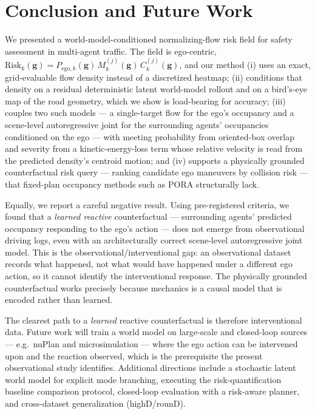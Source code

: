 \documentclass[journal]{IEEEtran}
\begin{document}
\section{Conclusion and Future Work}\label{section:conclusion_future_work}
We presented a world-model-conditioned normalizing-flow risk field for safety assessment in multi-agent traffic. The field is ego-centric, $\mathrm{Risk}_{k}(\mathbf{g})=P_{\mathrm{ego},k}(\mathbf{g})\,M^{(j)}_{k}(\mathbf{g})\,C^{(j)}_{k}(\mathbf{g})$, and our method (i) uses an exact, grid-evaluable flow density instead of a discretized heatmap; (ii) conditions that density on a residual deterministic latent world-model rollout and on a bird's-eye map of the road geometry, which we show is load-bearing for accuracy; (iii) couples two such models --- a single-target flow for the ego's occupancy and a scene-level autoregressive joint for the surrounding agents' occupancies conditioned on the ego --- with meeting probability from oriented-box overlap and severity from a kinetic-energy-loss term whose relative velocity is read from the predicted density's centroid motion; and (iv) supports a physically grounded counterfactual risk query --- ranking candidate ego maneuvers by collision risk --- that fixed-plan occupancy methods such as PORA \cite{wang2025dynamic} structurally lack.

Equally, we report a careful negative result. Using pre-registered criteria, we found that a \emph{learned reactive} counterfactual --- surrounding agents' predicted occupancy responding to the ego's action --- does not emerge from observational driving logs, even with an architecturally correct scene-level autoregressive joint model. This is the observational/interventional gap: an observational dataset records what happened, not what would have happened under a different ego action, so it cannot identify the interventional response. The physically grounded counterfactual works precisely because mechanics is a causal model that is encoded rather than learned.

The clearest path to a \emph{learned} reactive counterfactual is therefore interventional data. Future work will train a world model on large-scale and closed-loop sources --- e.g.\ nuPlan and microsimulation --- where the ego action can be intervened upon and the reaction observed, which is the prerequisite the present observational study identifies. Additional directions include a stochastic latent world model for explicit mode branching, executing the risk-quantification baseline comparison protocol, closed-loop evaluation with a risk-aware planner, and cross-dataset generalization (highD/rounD).



\end{document}
